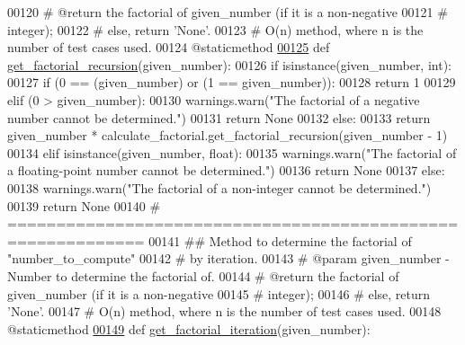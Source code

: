 \begin{DoxyCode}
00120     \textcolor{comment}{#   @return the factorial of given\_number (if it is a non-negative}
00121     \textcolor{comment}{#       integer);}
00122     \textcolor{comment}{#       else, return 'None'.}
00123     \textcolor{comment}{#   O(n) method, where n is the number of test cases used.}
00124     @staticmethod
\hypertarget{get__factorial_8py_source_l00125}{}\hyperlink{classutilities_1_1timing__measurements_1_1get__factorial_1_1calculate__factorial_ad985135073d51b522bdfb4c5b5569456}{00125}     \textcolor{keyword}{def }\hyperlink{classutilities_1_1timing__measurements_1_1get__factorial_1_1calculate__factorial_ad985135073d51b522bdfb4c5b5569456}{get\_factorial\_recursion}(given\_number):
00126         \textcolor{keywordflow}{if} isinstance(given\_number, int):
00127             \textcolor{keywordflow}{if} (0 == (given\_number) \textcolor{keywordflow}{or} (1 == given\_number)):
00128                 \textcolor{keywordflow}{return} 1
00129             \textcolor{keywordflow}{elif} (0 > given\_number):
00130                 warnings.warn(\textcolor{stringliteral}{"The factorial of a negative number cannot be determined."})
00131                 \textcolor{keywordflow}{return} \textcolor{keywordtype}{None}
00132             \textcolor{keywordflow}{else}:
00133                 \textcolor{keywordflow}{return} given\_number * calculate\_factorial.get\_factorial\_recursion(given\_number - 1)
00134         \textcolor{keywordflow}{elif} isinstance(given\_number, float):
00135             warnings.warn(\textcolor{stringliteral}{"The factorial of a floating-point number cannot be determined."})
00136             \textcolor{keywordflow}{return} \textcolor{keywordtype}{None}
00137         \textcolor{keywordflow}{else}:
00138             warnings.warn(\textcolor{stringliteral}{"The factorial of a non-integer cannot be determined."})
00139             \textcolor{keywordflow}{return} \textcolor{keywordtype}{None}
00140     \textcolor{comment}{# ============================================================}
00141     \textcolor{comment}{##  Method to determine the factorial of "number\_to\_compute"}
00142     \textcolor{comment}{#       by iteration.}
00143     \textcolor{comment}{#   @param given\_number - Number to determine the factorial of.}
00144     \textcolor{comment}{#   @return the factorial of given\_number (if it is a non-negative}
00145     \textcolor{comment}{#       integer);}
00146     \textcolor{comment}{#       else, return 'None'.}
00147     \textcolor{comment}{#   O(n) method, where n is the number of test cases used.}
00148     @staticmethod
\hypertarget{get__factorial_8py_source_l00149}{}\hyperlink{classutilities_1_1timing__measurements_1_1get__factorial_1_1calculate__factorial_a4233e6dad246c88e546c31f5752a1ee1}{00149}     \textcolor{keyword}{def }\hyperlink{classutilities_1_1timing__measurements_1_1get__factorial_1_1calculate__factorial_a4233e6dad246c88e546c31f5752a1ee1}{get\_factorial\_iteration}(given\_number):

\end{DoxyCode}
